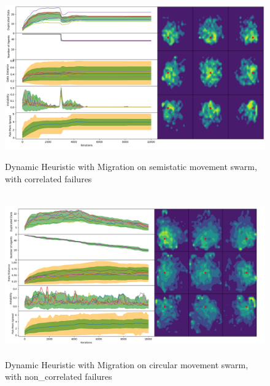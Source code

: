 \documentclass{UoYCSproject}
\begin{document}
\begin{figure}[htb]
\label{fig:static_movement_con3}
\begin{center}
\centering
\includegraphics[height=7cm]{"./Dynamic_Migration/Static_Move_con.png"}
\caption{Dynamic Heuristic with Migration on semi\-static movement swarm, with correlated failures}
\end{center}
\end{figure}

\begin{figure}[htb]
\label{fig:circle_movement_non3}
\begin{center}
\centering
\includegraphics[height=7cm]{"./Dynamic_Migration/Circle_Move_non2.png"}
\caption{Dynamic Heuristic with Migration on circular movement swarm, with non\_correlated failures}
\end{center}
\end{figure}
\end{document}
